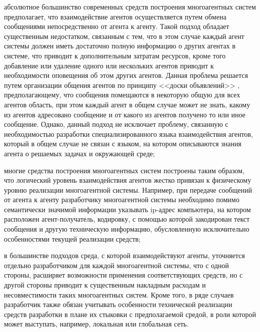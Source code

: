\begin{SCn}
{\begin{scnitemize}
\item абсолютное большинство современных средств построения многоагентных систем предполагает, что взаимодействие агентов осуществляется путем обмена сообщениями непосредственно от агента к агенту. Такой подход обладает существенным недостатком, связанным с тем, что в этом случае каждый агент системы должен иметь достаточно полную информацию о других агентах в системе, что приводит к дополнительным затратам ресурсов, кроме того добавление или удаление одного или нескольких агентов приводит к необходимости оповещения об этом других агентов. Данная проблема решается путем организации общения агентов по принципу <<доски объявлений>> , предполагающему, что сообщения помещаются в некоторую общую для всех агентов область, при этом каждый агент в общем случае может не знать, какому из агентов адресовано сообщение и от какого из агентов получено то или иное сообщение. Однако, данный подход не исключает проблему, связанную с необходимостью разработки специализированного языка взаимодействия агентов, который в общем случае не связан с языком, на котором описываются знания агента о решаемых задачах и окружающей среде;
\item многие средства построения многоагентных систем построены таким образом, что логический уровень взаимодействия агентов жестко привязан к физическому уровню реализации многоагентной системы. Например, при передаче сообщений от агента к агенту разработчику многоагентной системы необходимо помимо семантически значимой информации указывать ip-адрес компьютера, на котором расположен агент-получатель, кодировку, с помощью которой закодирован текст сообщения и другую техническую информацию, обусловленную исключительно особенностями текущей реализации средств;
\item в большинстве подходов среда, с которой взаимодействуют агенты, уточняется отдельно разработчиком для каждой многоагентной системы, что с одной стороны, расширяет возможности применения соответствующих средств, но с другой стороны приводит к существенным накладным расходам и несовместимости таких многоагентных систем. Кроме того, в ряде случаев разработчик также обязан учитывать особенности технической реализации средств разработки в плане их стыковки с предполагаемой средой, в роли которой может выступать, например, локальная или глобальная сеть.
\end{scnitemize}}

\scnendstruct

\end{SCn}
